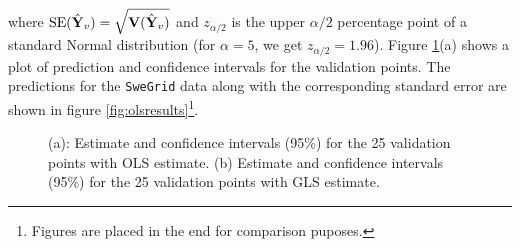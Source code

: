 \documentclass[a4paper,10pt]{article}
\def\bY{{\bf Y}}
\def\bV{{\bf V}}
\begin{document}
where $\text{SE}(\hat \bY_v) = \sqrt{\bV(\hat \bY_v)}$ and $z_{\alpha/2}$ is the upper $\alpha/2$ percentage point of a standard Normal distribution (for $\alpha = 5$, we get $z_{\alpha/2} = 1.96$). Figure \ref{fig:olsglsval}(a) shows a plot of prediction and confidence intervals for the validation points. The predictions for the {\texttt{SweGrid}} data along with the corresponding standard error are shown in figure \ref{fig:olsresults}\footnote{Figures are placed in the end for comparison puposes.}.
\begin{figure}[ht]
\centering
  \qquad
  \caption{(a): Estimate and confidence intervals (95\%) for the 25 validation points with OLS estimate. (b) Estimate and confidence intervals (95\%) for the 25 validation points with GLS estimate.}
\label{fig:olsglsval}
\end{figure}
\end{document}
